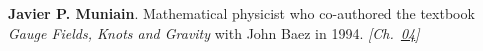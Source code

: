\textbf{Javier P. Muniain}. Mathematical physicist who co-authored the textbook \emph{Gauge Fields, Knots and Gravity} with John Baez in 1994. \emph{[Ch.~\hyperref[ch:energytransmission]{04}]}


